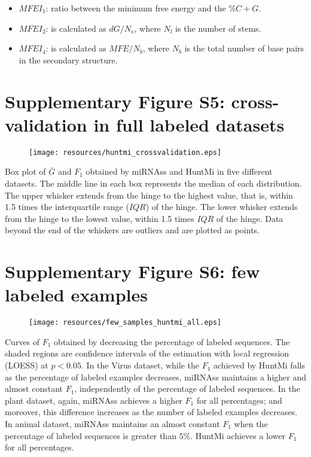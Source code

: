 \documentclass[]{scrartcl}
\begin{document}
\begin{itemize}
	\item $MFEI_1$: ratio between the minimum free energy and the $\%C + G$.
	\item $MFEI_2$: is calculated as $dG/N_{s}$, where $N_{l}$ is the number of stems.
	\item $MFEI_4$: is calculated as $MFE/N_{b}$, where $N_{b}$ is the total number of base pairs in the secondary structure.
\end{itemize}

	\newpage
	\section*{Supplementary Figure S5: cross-validation in full labeled datasets}
	\begin{figure}[h]
		\centering
		\texttt{[image: resources/huntmi\_crossvalidation.eps]}
		\label{fig:huntmi}
	\end{figure}

	Box plot of $\bar{G}$ and $F_{1}$ obtained by miRNAss and HuntMi in five different datasets. The middle line in each box represents the median of each distribution. The upper whisker extends from the hinge to the highest value, that is, within 1.5 times the interquartile range ($IQR$) of the hinge. The lower whisker extends from the hinge to the lowest value, within 1.5 times $IQR$ of the hinge. Data beyond the end of the whiskers are outliers and are plotted as points.

\newpage
\section*{Supplementary Figure S6: few labeled examples}
	\begin{figure}[h!]
		\centering
		\texttt{[image: resources/few\_samples\_huntmi\_all.eps]}
		\label{fig:fewSamples}
	\end{figure}

	Curves of $F_{1}$ obtained by decreasing the percentage of labeled sequences. The shaded regions are confidence intervals of the estimation with local regression (LOESS) at $p<0.05$. In the Virus dataset, while the $F_{1}$ achieved by HuntMi falls as the percentage of labeled examples decreases, miRNAss maintains a higher and almost constant $F_{1}$, independently of the percentage of labeled sequences. In the plant dataset, again, miRNAss achieves a higher $F_{1}$ for all percentages; and moreover, this difference increases as the number of labeled examples decreases. In animal dataset, miRNAss maintains an almost constant $F_{1}$ when the percentage of labeled sequences is greater than $5\%$. HuntMi achieves a lower $F_{1}$ for all percentages.
\end{document}
